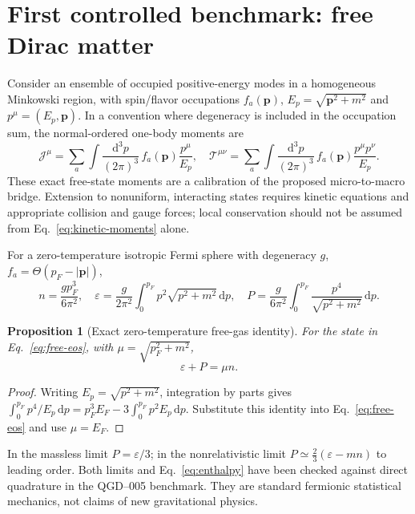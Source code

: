 \documentclass[11pt,a4paper]{article}
\newcommand{\dd}{\mathrm d}
\newcommand{\TT}{\mathcal T}
\newcommand{\JJ}{\mathcal J}
\newtheorem{proposition}{Proposition}[section]
\begin{document}
\section{First controlled benchmark: free Dirac matter}\label{sec:free-ensemble}
Consider an ensemble of occupied positive-energy modes in a homogeneous Minkowski region, with spin/flavor occupations $f_a(\bm p)$, $E_p=\sqrt{\bm p^2+m^2}$ and $p^\mu=(E_p,\bm p)$. In a convention where degeneracy is included in the occupation sum, the normal-ordered one-body moments are
\begin{equation}\label{eq:kinetic-moments}
\JJ^\mu=\sum_a\int\frac{\dd^3p}{(2\pi)^3}\,f_a(\bm p)\frac{p^\mu}{E_p},\quad
\TT^{\mu\nu}=\sum_a\int\frac{\dd^3p}{(2\pi)^3}\,f_a(\bm p)\frac{p^\mu p^\nu}{E_p}.
\end{equation}
These exact free-state moments are a calibration of the proposed micro-to-macro bridge. Extension to nonuniform, interacting states requires kinetic equations and appropriate collision and gauge forces; local conservation should not be assumed from Eq.~\eqref{eq:kinetic-moments} alone.

For a zero-temperature isotropic Fermi sphere with degeneracy $g$, $f_a=\Theta(p_F-|\bm p|)$,
\begin{equation}\label{eq:free-eos}
\boxed{n=\frac{gp_F^3}{6\pi^2},\quad
\varepsilon=\frac{g}{2\pi^2}\int_0^{p_F}p^2\sqrt{p^2+m^2}\,\dd p,\quad
P=\frac{g}{6\pi^2}\int_0^{p_F}\frac{p^4}{\sqrt{p^2+m^2}}\,\dd p.}
\end{equation}
\begin{proposition}[Exact zero-temperature free-gas identity]\label{prop:enthalpy}
For the state in Eq.~\eqref{eq:free-eos}, with $\mu=\sqrt{p_F^2+m^2}$,
\begin{equation}\label{eq:enthalpy}
\varepsilon+P=\mu n.
\end{equation}
\end{proposition}
\begin{proof}
Writing $E_p=\sqrt{p^2+m^2}$, integration by parts gives
$\int_0^{p_F}p^4/E_p\,\dd p=p_F^3E_F-3\int_0^{p_F}p^2E_p\,\dd p$.
Substitute this identity into Eq.~\eqref{eq:free-eos} and use $\mu=E_F$.
\end{proof}
In the massless limit $P=\varepsilon/3$; in the nonrelativistic limit $P\simeq\frac23(\varepsilon-mn)$ to leading order. Both limits and Eq.~\eqref{eq:enthalpy} have been checked against direct quadrature in the QGD--005 benchmark. They are standard fermionic statistical mechanics, not claims of new gravitational physics.
\end{document}
